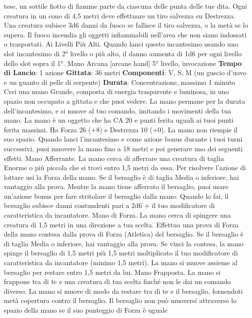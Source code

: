\begin{multicols}{2}
tese, un sottile fiotto di fiamme parte da ciascuna delle
punta delle tue dita. Ogni creatura in un cono di 4,5
metri deve effettuare un tiro salvezza su Destrezza.
Una creatura subisce 3d6 danni da fuoco se fallisce il
tiro salvezza, o la metà se lo supera.
Il fuoco incendia gli oggetti infiammabili nell’area che
non siano indossati o trasportati.
Ai Livelli Più Alti. Quando lanci questo incantesimo
usando uno slot incantesimo di 2° livello o più alto, il
danno aumenta di 1d6 per ogni livello dello slot sopra il
1°.
Mano Arcana
[arcane hand]
5° livello, invocazione
\textbf{Tempo di Lancio}: 1 azione
\textbf{Gittata}: 36 metri
\textbf{Componenti}: V, S, M (un guscio d’uovo e un guanto di
pelle di serpente)
\textbf{Durata}: Concentrazione, massimo 1 minuto
Crei una mano Grande, composta di energia
trasparente e luminosa, in uno spazio non occupato a
gittata e che puoi vedere. La mano permane per la
durata dell’incantesimo, e si muove al tuo comando,
imitando i movimenti della tua mano.
La mano è un oggetto che ha CA 20 e punti ferita uguali
ai tuoi punti ferita massimi. Ha Forza 26 (+8) e
Destrezza 10 (+0). La mano non riempie il suo spazio.
Quando lanci l’incantesimo e come azione bonus
durante i tuoi turni successivi, puoi muovere la mano
fino a 18 metri e poi generare uno dei seguenti effetti.
Mano Afferrante. La mano cerca di afferrare una
creatura di taglia Enorme o più piccola che si trovi entro 
1,5 metri da essa. Per risolvere l’azione di lottare usi la
Forza della mano. Se il bersaglio è di taglia Media o
inferiore, hai vantaggio alla prova. Mentre la mano tiene
afferrato il bersaglio, puoi usare un’azione bonus per
fare stritolare il bersaglio dalla mano. Quando lo fai, il
bersaglio subisce danni contundenti pari a 2d6 + il tuo
modificatore di caratteristica da incantatore.
Mano di Forza. La mano cerca di spingere una
creatura di 1,5 metri in una direzione a tua scelta.
Effettua una prova di Forza della mano contesa dalla
prova di Forza (Atletica) del bersaglio. Se il bersaglio è
di taglia Media o inferiore, hai vantaggio alla prova. Se
vinci la contesa, la mano spinge il bersaglio di 1,5 metri
più 1,5 metri moltiplicato il tuo modificatore di
caratteristica da incantatore (minimo 1,5 metri). La
mano si muove assieme al bersaglio per restare entro
1,5 metri da lui.
Mano Frapposta. La mano si frappone tra di te e una
creatura di tua scelta finché non le dai un comando
diverso. La mano si muove di modo da restare tra di te
e il bersaglio, fornendoti metà copertura contro il
bersaglio. Il bersaglio non può muoversi attraverso lo
spazio della mano se il suo punteggio di Forza è uguale

\end{multicols}
